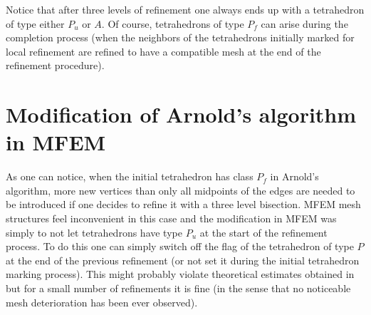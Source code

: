 \documentclass[a4paper,12pt]{amsart}
\numberwithin{equation}{section}
\begin{document}
\begin{center}
\end{center}

Notice that after three levels of refinement one always ends up with a tetrahedron of type either $P_u$ or $A$. Of course, tetrahedrons of type $P_f$ can arise during the completion process (when the neighbors of the tetrahedrons initially marked for local refinement are refined to have a compatible mesh at the end of the refinement procedure).

\section{Modification of Arnold's algorithm in MFEM}

As one can notice, when the initial tetrahedron has class $P_f$ in Arnold's algorithm, more new vertices than only all midpoints of the edges are needed to be introduced if one decides to refine it with a three level bisection. 
MFEM mesh structures feel inconvenient in this case and the modification in MFEM was simply to not let tetrahedrons have type $P_u$ at the start of the refinement process. To do this one can simply switch off the flag of the tetrahedron of type $P$ at the end of the previous refinement (or not set it during the initial tetrahedron marking process).
This might probably violate theoretical estimates obtained in \cite{arnold} but for a small number of refinements it is fine (in the sense that no noticeable mesh deterioration has been ever observed).
\end{document}
